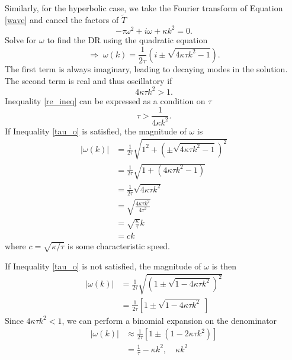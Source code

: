\documentclass[iop]{emulateapj}
\begin{document}
				Similarly, for the hyperbolic case, we take the Fourier transform of Equation \ref{wave} and cancel the factors of $\tilde{T}$
				\begin{equation}
					- \tau \omega^2 + i \omega + \kappa k^2 = 0.
				\end{equation}
				Solve for $\omega$ to find the \ac{DR} using the quadratic equation
				\begin{equation}
					\Rightarrow \; \omega(k) = \frac{1}{2 \tau} \left( i \pm \sqrt{4 \kappa \tau k^2 - 1} \right).
				\end{equation}
				The first term is always imaginary, leading to decaying modes in the solution.
				The second term is real and thus oscillatory if 
				\begin{equation} \label{re_ineq}
					 4 \kappa \tau k^2 > 1.
				\end{equation}
				Inequality \ref{re_ineq} can be expressed as a condition on $\tau$
				\begin{equation} \label{tau_o}
					\tau > \frac{1}{4 \kappa k^2}.
				\end{equation}			
				If Inequality \ref{tau_o} is satisfied, the magnitude of $\omega$ is
				\begin{align}
					|\omega(k)| &= \frac{1}{2 \tau} \sqrt{ 1^2 +  \left(\pm \sqrt{4 \kappa \tau k^2 - 1}\right)^2 } \\
								&= \frac{1}{2 \tau} \sqrt{1 + (4 \kappa \tau k^2 - 1)} \\
								&= \frac{1}{2 \tau} \sqrt{4 \kappa \tau k^2} \\
								&= \sqrt{\frac{4 \kappa \tau k^2}{4 \tau^2}} \\
								&= \sqrt{\frac{\kappa}{\tau}} k \\
								&= c k
				\end{align}
				where $c = \sqrt{\kappa / \tau}$ is some characteristic speed.
				
				If Inequality \ref{tau_o} is not satisfied, the magnitude of $\omega$ is then
				\begin{align}
					|\omega(k)| &= \frac{1}{2 \tau} \sqrt{\left( 1 \pm \sqrt{1 - 4 \kappa \tau k^2} \right)^2} \\
								&= \frac{1}{2 \tau} \left[ 1 \pm \sqrt{1 - 4 \kappa \tau k^2} \; \right]
				\end{align}
				Since $4 \kappa \tau k^2 < 1$, we can perform a binomial expansion on the denominator
				\begin{align}
					|\omega(k)| &\approx \frac{1}{2 \tau} \left[ 1 \pm \left( 1 - 2 \kappa \tau k^2 \right) \right] \\
								&= \frac{1}{\tau} - \kappa k^2, \quad \kappa k^2
				\end{align}
\end{document}
